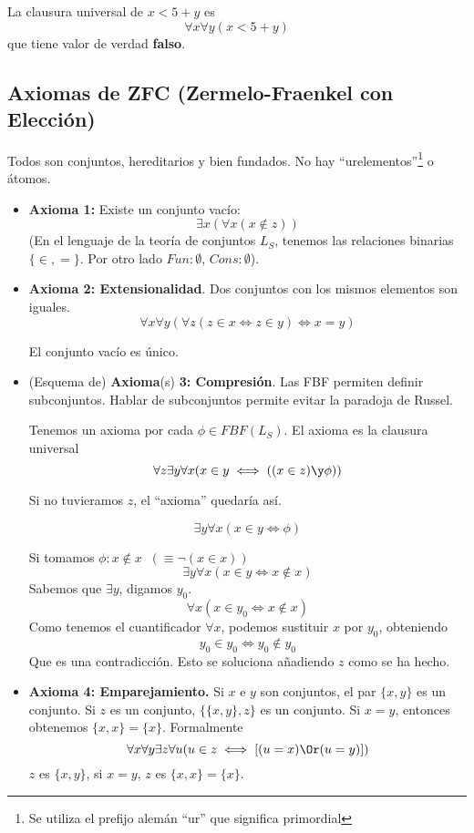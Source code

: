 \begin{example}
	La clausura universal de $x < 5 + y$ es $$\forall x\forall y (x < 5 + y)$$ que tiene valor de verdad \textbf{falso}.
\end{example}

\subsection{Axiomas de ZFC (Zermelo-Fraenkel con Elección)}
	Todos son conjuntos, hereditarios y bien fundados.
	No hay ``urelementos''\footnote{Se utiliza el prefijo alemán ``ur'' que significa primordial} o átomos.
	\begin{itemize}
		\item \textbf{Axioma 1:} Existe un conjunto vacío:
		$$\exists x (\forall x (x\notin z))$$
		(En el lenguaje de la teoría de conjuntos $L_S$, tenemos las relaciones binarias $\{\in, =\}$. Por otro lado $Fun: \emptyset$, $Cons: \emptyset$).
		\item \textbf{Axioma 2: Extensionalidad}.
		Dos conjuntos con los mismos elementos son iguales.
		$$\forall x\forall y(\forall z (z\in x\iff z\in y)\iff x = y)$$
		\begin{corol}
			El conjunto vacío es único.
		\end{corol}
		
		\item (Esquema de) \textbf{Axioma}(s) \textbf{3: Compresión}. Las FBF permiten definir subconjuntos. Hablar de subconjuntos permite evitar la paradoja de Russel.
		
		Tenemos un axioma por cada $\phi\in FBF(L_S)$. El axioma es la clausura universal
		$$\forall z \exists y \forall x(x\in y\iff((x\in z)\y \phi))$$
		
		Si no tuvieramos $z$, el ``axioma'' quedaría así.
		
		$$\exists y \forall x (x\in y\iff \phi)$$
		
		Si tomamos $\phi: x\notin x \;\; (\equiv\neg (x\in x))$
		$$\exists y \forall x (x\in y\iff x\notin x)$$
		Sabemos que $\exists y$, digamos $y_0$.
		$$\forall x (x\in y_0 \iff x\notin x)$$ 
		Como tenemos el cuantificador $\forall x$, podemos sustituir $x$ por $y_0$, obteniendo
		$$y_0\in y_0 \iff y_0\notin y_0$$
		Que es una contradicción. Esto se soluciona añadiendo $z$ como se ha hecho.
		
		\item \textbf{Axioma 4: Emparejamiento.} Si $x$ e $y$ son conjuntos, el par $\{x, y\}$ es un conjunto. Si $z$ es un conjunto, $\{\{x,y\},z\}$ es un conjunto. Si $x = y$, entonces obtenemos $\{x,x\} = \{x\}$. Formalmente
		$$\forall x\forall y\exists z\forall u(u\in z\iff \left[(u=x)\Or (u=y)\right])$$
		$z$ es $\{x,y\}$, si $x=y$, $z$ es $\{x,x\}=\{x\}$.
	\end{itemize}
	
